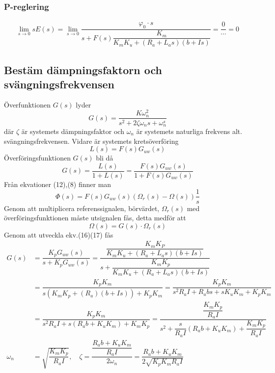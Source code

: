 \documentclass[11pt]{article}
\begin{document}
\subsubsection{P-reglering}
\begin{equation*}
\begin{split}
\lim_{s \to 0}sE(s) =\lim_{s \to 0} \dfrac{\varphi_0\cdot s}{s+F(s)\dfrac{K_m}{K_mK_u+(R_a+L_as)(b+Is)}} = \dfrac{0}{\cdots} = 0
\end{split}
\end{equation*}
\subsection{Bestäm dämpningsfaktorn och svängningsfrekvensen}
Överfunktionen $G(s)$ lyder
\begin{equation}
G(s) = \dfrac{K\omega_n^2}{s^2+2\zeta\omega_ns+\omega_n^s}
\end{equation}
där $\zeta$ är systemets dämpningsfaktor och $\omega_n$ är systemets naturliga frekvens alt. svängningsfrekvensen. Vidare är systemets  kretsöverföring
\begin{equation}
L(s)=F(s)G_{uw}(s)
\end{equation}
Överföringsfunktionen $G(s)$ bli då 
\begin{equation}
G(s)=\dfrac{L(s)}{1+L(s)} = \dfrac{F(s)G_{uw}(s)}{1+F(s)G_{uw}(s)}
\end{equation}
Från ekvationer (12),(8) finner man
\begin{equation}
\Phi(s) = F(s)G_{uw}(s)(\Omega_r(s)-\Omega(s))\frac{1}{s}
\end{equation}
Genom att multiplicera referenssignalen, börvärdet, $\Omega_r(s)$ med överföringsfunktionen måste utsignalen fås, detta medför att
\begin{equation}
\Omega(s)=G(s)\cdot \Omega_r(s)
\end{equation}
Genom att utveckla ekv.(16)(17) fås
\begin{equation*}
\begin{split}
G(s)&= \dfrac{K_pG_{uw}(s)}{s+K_pG_{uw}(s)} = \dfrac{\dfrac{K_mK_P}{K_mK_u+(R_a+L_as)(b+Is)}}{s+\dfrac{K_mK_p}{K_mK_u+(R_a+L_as)(b+Is)}}\\
&=
\dfrac{K_pK_m}{s(K_mK_p+(R_a)(b+Is))+K_pK_m} =
\dfrac{K_pK_m}{s^2R_aI+R_abs+sK_uK_m+K_pK_m}\\ &=
\dfrac{K_pK_m}{s^2R_aI+s(R_ab+K_uK_m)+K_mK_p} =
\dfrac{\dfrac{K_mK_p}{R_aI}}{s^2+\dfrac{s}{R_aI}(R_ab+K_uK_m)+\dfrac{K_mK_p}{R_aI}}\\
\omega_n&=\sqrt{\dfrac{K_mK_p}{R_aI}}, \quad
\zeta=\dfrac{\dfrac{R_ab+K_uK_m}{R_aI}}{2\omega_n} =\dfrac{R_ab+K_uK_m}{2\sqrt{K_pK_mR_aI}}
\end{split}
\end{equation*}
\end{document}
